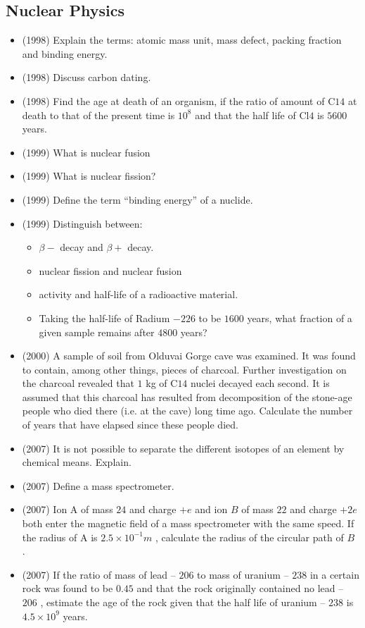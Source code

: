 \documentclass{article}
\begin{document}
\subsection{Nuclear Physics}
\begin{itemize}
\item (1998)  Explain the terms: atomic mass unit, mass defect, packing fraction and binding energy.
\item (1998)  Discuss carbon dating.
\item (1998)  Find the age at death of an organism, if the ratio of amount of C$ 14$ at death to that of the present time is $ 10^{8}$ and that the half life of Cl$ 4$ is $ 5600$ years.
\item (1999)  What is nuclear fusion 
\item (1999)  What is nuclear fission?
\item (1999)  Define the term “binding energy” of a nuclide.
\item (1999)  Distinguish between:
 \begin{itemize}
\item $ \beta -$ decay and $ \beta +$ decay.
\item nuclear fission and nuclear fusion
\item activity and half-life of a radioactive material.
\item Taking the half-life of Radium $ -226$ to be $ 1600$ years, what fraction of a given sample remains after $ 4800$ years?
\end{itemize}
\item (2000)  A sample of soil from Olduvai Gorge cave was examined. It was found to contain, among other things, pieces of charcoal. Further investigation on the charcoal revealed that $ 1$ kg of C$ 14$ nuclei decayed each second. It is assumed that this charcoal has resulted from decomposition of the stone-age people who died there (i.e. at the cave) long time ago. Calculate the number of years that have elapsed since these people died.
\item (2007)  It is not possible to separate the different isotopes of an element by chemical means.  Explain.
\item (2007)  Define a mass spectrometer. 
\item (2007)  Ion A of mass $ 24$ and charge $ +e$ and ion $ B$ of mass $ 22$ and charge $ +2e$ both enter the magnetic field of a mass spectrometer with the same speed. If the radius of A is $ 2.5 \times 10^{-1}m$ , calculate the radius of the circular path of $ B$ . 
\item (2007)  If the ratio of mass of lead – $ 206$  to mass of uranium – $ 238$ in a certain rock was found to be $ 0.45$ and that the rock originally contained no lead – $ 206$ , estimate the age of the rock given that the half life of uranium – $ 238$ is $ 4.5 \times 10^{9}$ years.

\end{itemize}
\end{document}
